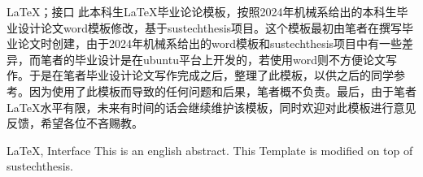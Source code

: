 

\begin{中文摘要}{\LaTeX ；接口}
    此本科生\LaTeX 毕业论论模板，按照2024年机械系给出的本科生毕业设计论文word模板修改，基于sustechthesis项目\footnotemark[1]。这个模板最初由笔者在撰写毕业论文时创建，由于2024年机械系给出的word模板和sustechthesis项目中有一些差异，而笔者的毕业设计是在ubuntu平台上开发的，若使用word则不方便论文写作。于是在笔者毕业设计论文写作完成之后，整理了此模板，以供之后的同学参考。因为使用了此模板而导致的任何问题和后果，笔者概不负责。最后，由于笔者\LaTeX 水平有限，未来有时间的话会继续维护该模板，同时欢迎对此模板进行意见反馈，希望各位不吝赐教。
\end{中文摘要}



\begin{英文摘要}{LaTeX, Interface}
    This is an english abstract. This Template is modified on top of sustechthesis\footnotemark[1].
\end{英文摘要}
